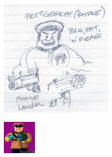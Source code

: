 \documentclass[book.tex]{subfiles}
\begin{document}
      \begin{minipage}{.48\textwidth}
     \includegraphics[width=\textwidth]{screenshots/sprites/tom_hall_sketch_officer.png}
  \end{minipage}
      \begin{minipage}{.48\textwidth}
     \includegraphics[width=\textwidth]{screenshots/sprites/fettgesic.png}
  \end{minipage}
\end{document}
